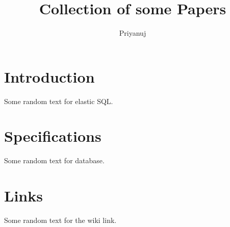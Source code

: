 \documentclass[conference]{IEEEtran}
\title{Collection of some Papers}
\author{Priyanuj}
\date{}
\begin{document}
	\maketitle
	\section{Introduction}
	Some random text for elastic SQL. \cite{Tatemura} \lipsum[1-2]
	
	\section{Specifications}
	Some random text for database. \cite{ullman} \lipsum[1-2]
	
	\section{Links}
	Some random text for the wiki link. \cite{wiki} \lipsum[1-2]
	
	\nocite{baum2003collapse}
	
	
	
\end{document}
